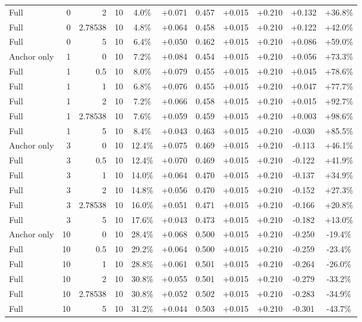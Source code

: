 \begin{table}[htbp]
\begin{tabular}{lrrrccccccc}
Full & 0 & 2 & 10 & 4.0\% & +0.071 & 0.457 & +0.015 & +0.210 & +0.132 & +36.8\% \\
Full & 0 & 2.78538 & 10 & 4.8\% & +0.064 & 0.458 & +0.015 & +0.210 & +0.122 & +42.0\% \\
Full & 0 & 5 & 10 & 6.4\% & +0.050 & 0.462 & +0.015 & +0.210 & +0.086 & +59.0\% \\
Anchor only & 1 & 0 & 10 & 7.2\% & +0.084 & 0.454 & +0.015 & +0.210 & +0.056 & +73.3\% \\
Full & 1 & 0.5 & 10 & 8.0\% & +0.079 & 0.455 & +0.015 & +0.210 & +0.045 & +78.6\% \\
Full & 1 & 1 & 10 & 6.8\% & +0.076 & 0.455 & +0.015 & +0.210 & +0.047 & +77.7\% \\
Full & 1 & 2 & 10 & 7.2\% & +0.066 & 0.458 & +0.015 & +0.210 & +0.015 & +92.7\% \\
Full & 1 & 2.78538 & 10 & 7.6\% & +0.059 & 0.459 & +0.015 & +0.210 & +0.003 & +98.6\% \\
Full & 1 & 5 & 10 & 8.4\% & +0.043 & 0.463 & +0.015 & +0.210 & -0.030 & +85.5\% \\
Anchor only & 3 & 0 & 10 & 12.4\% & +0.075 & 0.469 & +0.015 & +0.210 & -0.113 & +46.1\% \\
Full & 3 & 0.5 & 10 & 12.4\% & +0.070 & 0.469 & +0.015 & +0.210 & -0.122 & +41.9\% \\
Full & 3 & 1 & 10 & 14.0\% & +0.064 & 0.470 & +0.015 & +0.210 & -0.137 & +34.9\% \\
Full & 3 & 2 & 10 & 14.8\% & +0.056 & 0.470 & +0.015 & +0.210 & -0.152 & +27.3\% \\
Full & 3 & 2.78538 & 10 & 16.0\% & +0.051 & 0.471 & +0.015 & +0.210 & -0.166 & +20.8\% \\
Full & 3 & 5 & 10 & 17.6\% & +0.043 & 0.473 & +0.015 & +0.210 & -0.182 & +13.0\% \\
Anchor only & 10 & 0 & 10 & 28.4\% & +0.068 & 0.500 & +0.015 & +0.210 & -0.250 & -19.4\% \\
Full & 10 & 0.5 & 10 & 29.2\% & +0.064 & 0.500 & +0.015 & +0.210 & -0.259 & -23.4\% \\
Full & 10 & 1 & 10 & 28.8\% & +0.061 & 0.501 & +0.015 & +0.210 & -0.264 & -26.0\% \\
Full & 10 & 2 & 10 & 30.8\% & +0.055 & 0.501 & +0.015 & +0.210 & -0.279 & -33.2\% \\
Full & 10 & 2.78538 & 10 & 30.8\% & +0.052 & 0.502 & +0.015 & +0.210 & -0.283 & -34.9\% \\
Full & 10 & 5 & 10 & 31.2\% & +0.044 & 0.503 & +0.015 & +0.210 & -0.301 & -43.7\% \\

\end{tabular}
\end{table}
